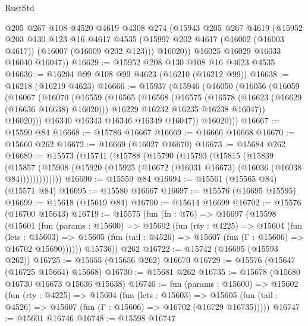 \begin{lexlean}{RustStd}
\begin{coremodule}
        @205
        @267
        @108
        @4520
        @4619
        @4308
        @274
        (@15943
          @205
          @267
          @4619
          (@15952
            @203
            @130
            @123
            @16
            @4617
            @4535
            (@15997 @202 @4617 (@16002 (@16003 @4617)) (@16007 (@16009 @202 @123)))
            @16020))
        @16025
        @16029
        @16033
        @16040
        @16047))
@16629 := @15952 @208 @130 @108 @16 @4623 @4535
@16636 := @16204 @99 @108 @99 @4623 (@16210 (@16212 @99))
@16638 := @16218 (@16219 @4623)
@16666 := @15937
    (@15946
      (@16050
        (@16056
          (@16059
            (@16067
              (@16070
                (@16559
                  (@16565
                    (@16568
                      (@16575
                        (@16578 (@16623 (@16629 (@16636 @16638) @16020)))
                        @16229
                        @16232
                        @16235
                        @16238
                        @16047))
                    @16020)))
              @16340
              @16343
              @16346
              @16349
              @16047))
          @16020)))
@16667 := @15590 @84
@16668 := @15786 @16667
@16669 := @16666 @16668
@16670 := @15660 @262
@16672 := @16669 (@16027 @16670)
@16673 := @15684 @262
@16689 := @15573
    (@15741
      (@15788
        (@15790
          (@15793
            (@15815
              (@15839
                (@15857
                  (@15908 (@15920 (@15925 (@16672 (@16031 @16673) (@16036 (@16038 @84)))))))))))))
@16690 := @15559 @84
@16694 := @15561 (@15565 @84) (@15571 @84)
@16695 := @15580 @16667
@16697 := @15576 (@16695 @15595)
@16699 := @15618 (@15619 @84)
@16700 := @15614 @16699
@16702 := @15576 (@16700 @15643)
@16719 := @15575
    (fun (fn : @76) =>
    @16697
      (@15598
        (@15601
          (fun (params : @15600) =>
          @15602
            (fun (rty : @4225) =>
            @15604
              (fun (lets : @15603) =>
              @15605 (fun (tail : @4526) => @15607 (fun (Γ : @15606) => @16702 @15690))))))
        @15736))
    @262
@16722 := @15742 (@16695 (@15593 @262))
@16725 := @15655 (@15656 @262) @16670
@16729 := @15576 (@15647 (@16725 @15664) @15668)
@16730 := @15681 @262
@16735 := @15678 (@15680 @16730 @16673 @15636 @15638)
@16746 := fun (params : @15600) =>
  @15602
    (fun (rty : @4225) =>
    @15604
      (fun (lets : @15603) =>
      @15605 (fun (tail : @4526) => @15607 (fun (Γ : @15606) => @16702 (@16729 @16735)))))
@16747 := @15601 @16746
@16748 := @15598 @16747

\end{coremodule}
\end{lexlean}
